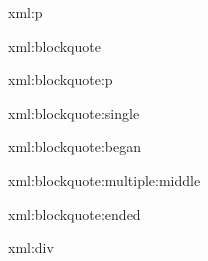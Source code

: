 %
%

\startxmlsetups xml:p
  \startparagraph
  \stopparagraph
\stopxmlsetups

\startxmlsetups xml:blockquote
\stopxmlsetups

\startxmlsetups xml:blockquote:p
\stopxmlsetups

\startxmlsetups xml:blockquote:single
  \startquotation
  \stopquotation
\stopxmlsetups

\startxmlsetups xml:blockquote:began
  \startquotation
\stopxmlsetups

\startxmlsetups xml:blockquote:multiple:middle
    \par{}
\stopxmlsetups

\startxmlsetups xml:blockquote:ended
    \par{}
  \stopquotation
\stopxmlsetups

\startxmlsetups xml:div
  \stop
\stopxmlsetups

